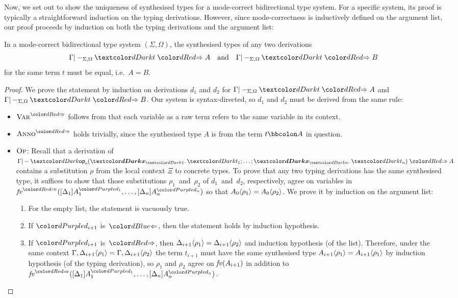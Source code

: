 Now, we set out to show the uniqueness of synthesised types for a mode-correct bidirectional type system.
For a specific system, its proof is typically a straightforward induction on the typing derivations.
However, since mode-correctness is inductively defined on the argument list, our proof proceeds by induction on both the typing derivations and the argument list:
\begin{lemma}\label{thm:unique-syn}
  In a mode-correct bidirectional type system $(\Sigma, \Omega)$, the synthesised types of any two derivations
  \[
    \Gamma |-_{\Sigma, \Omega} \isTerm{t} \syn A
    \quad\text{and}\quad
    \Gamma |-_{\Sigma, \Omega} \isTerm{t} \syn B
  \]
  for the same term $t$ must be equal, i.e.\ $A = B$.
\end{lemma}
\begin{proof}%
  We prove the statement by induction on derivations $d_1$ and $d_2$ for $\Gamma |-_{\Sigma, \Omega} \isTerm{t} \syn A$ and $\Gamma |-_{\Sigma, \Omega} \isTerm{t} \syn B$.
  Our system is syntax-directed, so $d_1$ and $d_2$ must be derived from the same rule: 
  \begin{itemize}
    \item $\SynRule{Var}$ follows from that each variable as a raw term refers to the same variable in its context.
    \item $\SynRule{Anno}$ holds trivially, since the synthesised type $A$ is from the term $t \annotate A$ in question.
    \item $\textnormal{\textsc{Op}}$: Recall that a derivation of\/ $\Gamma |- \tmOpts \syn A$ contains a substitution $\rho$ from the local context $\Xi$ to concrete types.
      To prove that any two typing derivations has the same synthesised type, it suffices to show that those substitutions $\rho_1$~and~$\rho_2$ of $d_1$~and~$d_2$, respectively, agree on variables in $\synvar(\biargs)$ so that ${A_0}\!\left<{\rho_1}\right> = {A_0}\!\left<{\rho_2}\right>$.
      We prove it by induction on the argument list:
      \begin{enumerate}
        \item For the empty list, the statement is vacuously true.
        \item If $\dir{d_{i+1}}$ is~$\chk$, then the statement holds by induction hypothesis.
        \item If $\dir{d_{i+1}}$ is~$\syn$, then ${\Delta_{i+1}}\!\left<{\rho_1}\right> = {\Delta_{i+1}}\!\left<{\rho_2}\right>$ and induction hypothesis (of the list).
          Therefore, under the same context $\Gamma, {\Delta_{i+1}}\!\left<{\rho_1}\right> = \Gamma, {\Delta_{i+1}}\!\left<{\rho_2}\right>$ the term $t_{i+1}$ must have the same synthesised type ${A_{i+1}}\!\left<{\rho_1}\right> = {A_{i+1}}\!\left<{\rho_1}\right>$ by induction hypothesis (of the typing derivation), so $\rho_1$ and $\rho_2$ agree on $\mathit{fv}(A_{i+1})$ in addition to $\synvar(\biargs)$.
      \end{enumerate}
  \end{itemize}
\end{proof}


